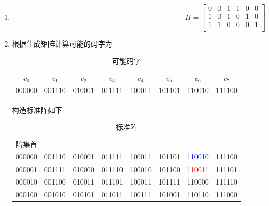 \documentclass{ctexart}
\begin{document}
\begin{enumerate}
    \item\begin{equation}
        H = \begin{bmatrix}
            0 & 0 & 1 & 1 & 0 & 0 \\
            1 & 0 & 1 & 0 & 1 & 0 \\
            1 & 1 & 0 & 0 & 0 & 1 \\
        \end{bmatrix}
    \end{equation}
    \item 根据生成矩阵计算可能的码字为
    \begin{table}[H]
        \centering
        \caption{可能码字}
        \begin{tabular}{cccccccc}
            \hline
            $c_0$ & $c_1$ & $c_2$ & $c_3$ & $c_4$ & $c_5$ & $c_6$ & $c_7$ \\
            000000 & 001110 & 010001 & 011111 & 100011 & 101101 & 110010 & 111100 \\
            \hline
        \end{tabular}
    \end{table}
    构造标准阵如下
    \begin{table}[H]
        \centering
        \caption{标准阵}
        \begin{tabular}{c|ccccccc}
            \hline
            陪集首 \\
            000000 & 001110 & 010001 & 011111 & 100011 & 101101 & \textcolor{blue}{110010} & 111100 \\
            \hline
            000001 & 001111 & 010000 & 011110 & 100010 & 101100 & \textcolor{red}{110011} & 111101 \\
            000010 & 001100 & 010011 & 011101 & 100011 & 101111 & 110000 & 111110 \\
            000100 & 001010 & 010101 & 011011 & 100111 & 101001 & 110110 & 111000 \\

\end{tabular}
\end{table}
\end{enumerate}
\end{document}
